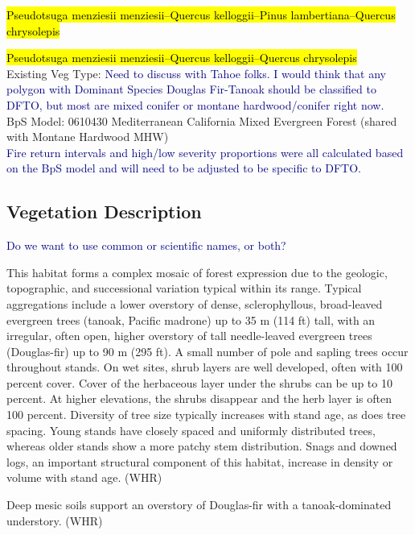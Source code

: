 \documentclass{article}
\newcommand{\mcomment}[1]{\textcolor{navy}{#1}}
\begin{document}
\par \hl{Pseudotsuga menziesii menziesii--Quercus kelloggii--Pinus lambertiana--Quercus chrysolepis}
\par \hl{Pseudotsuga menziesii menziesii--Quercus kelloggii--Quercus chrysolepis} \\
Existing Veg Type: \mcomment{Need to discuss with Tahoe folks. I would think that any polygon with Dominant Species Douglas Fir-Tanoak should be classified to DFTO, but most are mixed conifer or montane hardwood/conifer right now.} \\
BpS Model: 0610430 Mediterranean California Mixed Evergreen Forest (shared with Montane Hardwood MHW) \\
\mcomment{Fire return intervals and high/low severity proportions were all calculated based on the BpS model and will need to be adjusted to be specific to DFTO.}


\subsection*{Vegetation Description}

\mcomment{Do we want to use common or scientific names, or both?}
\par This habitat forms a complex mosaic of forest expression due to the geologic, topographic, and successional variation typical within its range. Typical aggregations include a lower overstory of dense, sclerophyllous, broad-leaved evergreen trees (tanoak, Pacific madrone) up to 35 m (114 ft) tall, with an irregular, often open, higher overstory of tall needle-leaved evergreen trees (Douglas-fir) up to 90 m (295 ft). A small number of pole and sapling trees occur throughout stands. On wet sites, shrub layers are well developed, often with 100 percent cover. Cover of the herbaceous layer under the shrubs can be up to 10 percent. At higher elevations, the shrubs disappear and the herb layer is often 100 percent. Diversity of tree size typically increases with stand age, as does tree spacing. Young stands have closely spaced and uniformly distributed trees, whereas older stands show a more patchy stem distribution. Snags and downed logs, an important structural component of this habitat, increase in density or volume with stand age. (WHR)

Deep mesic soils support an overstory of Douglas-fir with a tanoak-dominated understory. (WHR)
\end{document}
